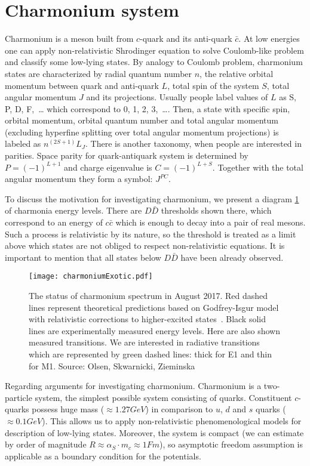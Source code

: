 \section{Charmonium system}
Charmonium is a meson built from $c$-quark and its anti-quark $\bar{c}$. At low energies one can apply non-relativistic Shrodinger equation to solve Coulomb-like problem and classify some low-lying states. By analogy to Coulomb problem, charmonium states are characterized by radial quantum number $n$, the relative orbital momentum between quark and anti-quark $L$, total spin of the system $S$, total angular momentum $J$ and its projections. Usually people label values of $L$ as S, P, D, F,~…  which correspond to 0, 1, 2, 3,~…. Then, a state with specific spin, orbital momentum, orbital quantum number and total angular momentum (excluding hyperfine splitting over total angular momentum projections) is labeled as $n^{(2S+1)} L_J$. There is another taxonomy, when people are interested in parities. Space parity for quark-antiquark system is determined by $P = (-1)^{L+1}$ and charge eigenvalue is $C = (-1)^{L+S}$. Together with the total angular momentum they form a symbol: $J^{P C}$.

To discuss the motivation for investigating charmonium, we present a diagram \cref{fig:charm-states} of charmonia energy levels. There are $D\bar{D}$ thresholds shown there, which correspond to an energy of $c \bar{c}$ which is enough to decay into a pair of real mesons. Such a process is relativistic by its nature, so the threshold is treated as a limit above which states are not obliged to respect non-relativistic equations. It is important to mention that all states below $D\bar{D}$ have been already observed.

\begin{figure}[H]
    \centering
    \texttt{[image: charmoniumExotic.pdf]}
    \caption{The status of charmonium spectrum in August 2017. Red dashed lines represent theoretical predictions based on Godfrey-Isgur model with relativistic corrections to higher-excited states~\cite{gbs-model}. Black solid lines are experimentally measured energy levels. Here are also shown measured transitions. We are interested in radiative transitions which are represented by green dashed lines: thick for E1 and thin for M1. Source: Olsen, Skwarnicki, Zieminska~\cite{heavy-quark_pics}} \label{fig:charm-states}
\end{figure}

Regarding arguments for investigating charmonium. Charmonium is a two-particle system, the simplest possible system consisting of quarks. Constituent $c$-quarks possess huge mass ($\approx 1.27 GeV$) in comparison to $u$, $d$ and $s$ quarks ($\approx 0.1 GeV$). This allows us to apply non-relativistic phenomenological models for description of low-lying states. Moreover, the system is compact (we can estimate by order of magnitude $R \approx \alpha_S \cdot m_c \approx 1 Fm$), so asymptotic freedom assumption is applicable as a boundary condition for the potentials.\cite{charm-slides}

